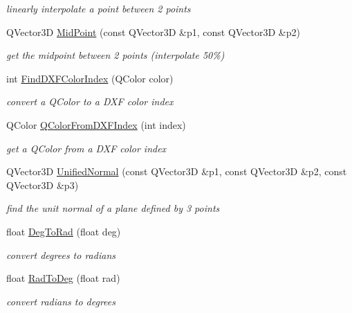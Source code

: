 \begin{DoxyCompactItemize}
\begin{DoxyCompactList}\small\item\em linearly interpolate a point between 2 points \end{DoxyCompactList}\item 
Q\-Vector3\-D \hyperlink{namespaceShipCAD_ad1ad66c896fe763fb4603989ff1f1182}{Mid\-Point} (const Q\-Vector3\-D \&p1, const Q\-Vector3\-D \&p2)
\begin{DoxyCompactList}\small\item\em get the midpoint between 2 points (interpolate 50\%) \end{DoxyCompactList}\item 
int \hyperlink{namespaceShipCAD_a87efc267ae07a84fb1cd55a4562c2907}{Find\-D\-X\-F\-Color\-Index} (Q\-Color color)
\begin{DoxyCompactList}\small\item\em convert a Q\-Color to a D\-X\-F color index \end{DoxyCompactList}\item 
Q\-Color \hyperlink{namespaceShipCAD_a9956eca83968462fc4c48c376a10d577}{Q\-Color\-From\-D\-X\-F\-Index} (int index)
\begin{DoxyCompactList}\small\item\em get a Q\-Color from a D\-X\-F color index \end{DoxyCompactList}\item 
Q\-Vector3\-D \hyperlink{namespaceShipCAD_a81e47e31f89000550b007c0f9a4d09aa}{Unified\-Normal} (const Q\-Vector3\-D \&p1, const Q\-Vector3\-D \&p2, const Q\-Vector3\-D \&p3)
\begin{DoxyCompactList}\small\item\em find the unit normal of a plane defined by 3 points \end{DoxyCompactList}\item 
float \hyperlink{namespaceShipCAD_ac344c080c66b4394cb988cf88c726029}{Deg\-To\-Rad} (float deg)
\begin{DoxyCompactList}\small\item\em convert degrees to radians \end{DoxyCompactList}\item 
float \hyperlink{namespaceShipCAD_a3ad1916db38fb61e8a053f944df49cee}{Rad\-To\-Deg} (float rad)
\begin{DoxyCompactList}\small\item\em convert radians to degrees \end{DoxyCompactList}\item 

\end{DoxyCompactItemize}
